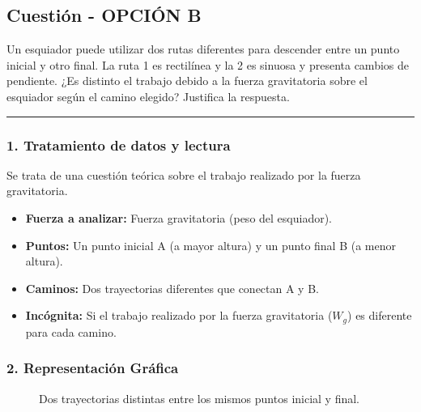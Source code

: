 \subsection{Cuestión - OPCIÓN B}
\label{subsec:B1B_2017_jun_ord}

\begin{cajaenunciado}
Un esquiador puede utilizar dos rutas diferentes para descender entre un punto inicial y otro final. La ruta 1 es rectilínea y la 2 es sinuosa y presenta cambios de pendiente. ¿Es distinto el trabajo debido a la fuerza gravitatoria sobre el esquiador según el camino elegido? Justifica la respuesta.
\end{cajaenunciado}
\hrule

\subsubsection*{1. Tratamiento de datos y lectura}
Se trata de una cuestión teórica sobre el trabajo realizado por la fuerza gravitatoria.
\begin{itemize}
    \item \textbf{Fuerza a analizar:} Fuerza gravitatoria (peso del esquiador).
    \item \textbf{Puntos:} Un punto inicial A (a mayor altura) y un punto final B (a menor altura).
    \item \textbf{Caminos:} Dos trayectorias diferentes que conectan A y B.
    \item \textbf{Incógnita:} Si el trabajo realizado por la fuerza gravitatoria ($W_g$) es diferente para cada camino.
\end{itemize}

\subsubsection*{2. Representación Gráfica}
\begin{figure}[H]
    \centering
    \caption{Dos trayectorias distintas entre los mismos puntos inicial y final.}
\end{figure}

